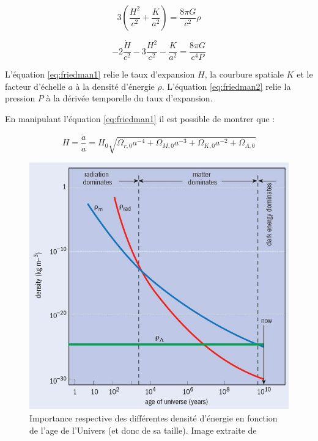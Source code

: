 
\begin{equation}
3 \left( \frac{H^2}{c^2} +\frac{K}{a^2} \right) = \frac{8 \pi G }{c^2} \rho
\label{eq:friedman1}
\end{equation}

\begin{equation}
-2 \frac{ \dot{H}}{c^2} -3 \frac{H^2}{c^2} -\frac{K}{a^2} = \frac{8 \pi G }{c^4 P}
\label{eq:friedman2}
\end{equation}

L'équation \ref{eq:friedman1} relie le taux d'expansion $H$, la courbure spatiale $K$ et le facteur d'échelle $a$ à la densité d'énergie $\rho$.
L'équation \ref{eq:friedman2} relie la pression $P$ à la dérivée temporelle du taux d'expansion.
  
En manipulant l'équation \ref{eq:friedman1} il est possible de montrer que :


\begin{equation}
H = \frac{\dot{a}}{a} = H_0 \sqrt{ \Omega_{r,0} a^{-4} +  \Omega_{M,0} a^{-3} + \Omega_{K,0}a^{-2} + \Omega_{\Lambda,0}  } 
\label{eq:scale_t}
\end{equation}


\begin{figure}
        \includegraphics[width=.9\linewidth]{img/01/dark4.jpg} 
        \caption[Densités d'énergies]{Importance respective des différentes densité d'énergie en fonction de l'age de l'Univers (et donc de sa taille). Image extraite de \citep{2005univ.book.....F}
 		\label{fig:cosmoparamt} }
\end{figure}


